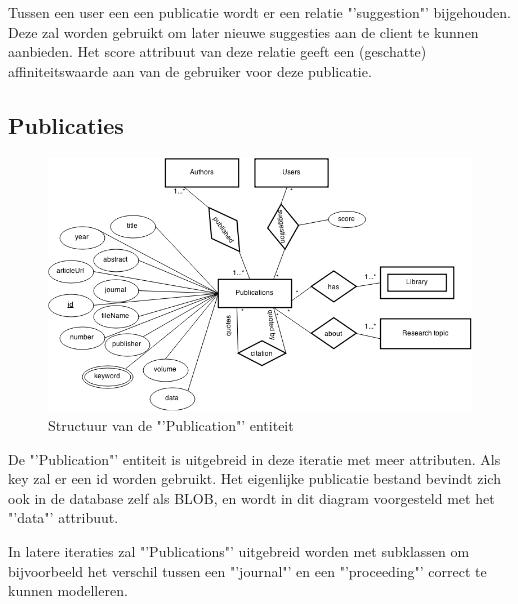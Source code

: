 \documentclass{article}
\begin{document}
Tussen een user een een publicatie wordt er een relatie "'suggestion"' bijgehouden. Deze zal worden gebruikt om later nieuwe suggesties aan de client te kunnen aanbieden. Het score attribuut van deze relatie geeft een (geschatte) affiniteitswaarde aan van de gebruiker voor deze publicatie.


\subsection{Publicaties}

\begin{figure}[!h]
\centering
 \includegraphics[width=145mm]{publication_diagram.png}
 \caption{Structuur van de "'Publication"' entiteit}
 \label{Publication-model}
\end{figure}

De "'Publication"' entiteit is uitgebreid in deze iteratie met meer attributen. Als key zal er een id worden gebruikt. Het eigenlijke publicatie bestand bevindt zich ook in de database zelf als BLOB, en wordt in dit diagram voorgesteld met het "'data"' attribuut.

In latere iteraties zal "'Publications"' uitgebreid worden met subklassen om bijvoorbeeld het verschil tussen een "'journal"' en een "'proceeding"' correct te kunnen modelleren.
\end{document}
